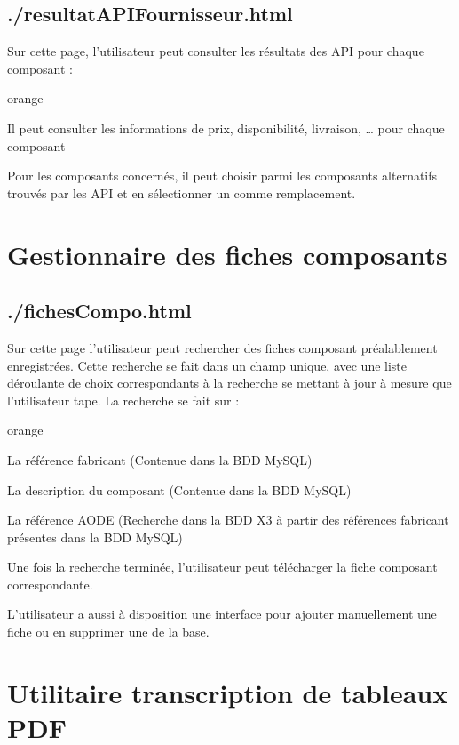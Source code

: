 \subsection{./resultatAPIFournisseur.html}

Sur cette page, l’utilisateur peut consulter les résultats des API pour chaque composant :

\begin{items}{orange}{\Triangle}
\item Il peut consulter les informations de prix, disponibilité, livraison, … pour chaque composant 
\item Pour les composants concernés, il peut choisir parmi les composants alternatifs trouvés par les API et en sélectionner un comme remplacement.
\end{items}

\section{Gestionnaire des fiches composants}

\subsection{./fichesCompo.html}

Sur cette page l’utilisateur peut rechercher des fiches composant préalablement enregistrées. Cette recherche se fait dans un champ unique, avec une liste déroulante de choix correspondants à la recherche se mettant à jour à mesure que l’utilisateur tape. La recherche se fait sur :

\begin{items}{orange}{\Triangle}
\item La référence fabricant (Contenue dans la BDD MySQL)
\item La description du composant (Contenue dans la BDD MySQL)
\item La référence AODE (Recherche dans la BDD X3 à partir des références fabricant présentes dans la BDD MySQL)
\end{items}

Une fois la recherche terminée, l’utilisateur peut télécharger la fiche composant correspondante.

L’utilisateur a aussi à disposition une interface pour ajouter manuellement une fiche ou en supprimer une de la base.


\section{Utilitaire transcription de tableaux PDF}

